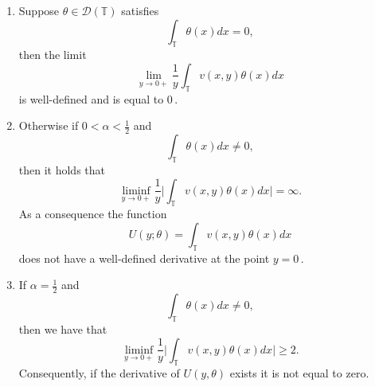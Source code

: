 \documentclass[10pt,a4paper]{amsart}
\begin{document}
\begin{proposition}\label{th1}
$$\,$$
\begin{enumerate}
\item Suppose $\theta \in \mathcal D({\mathbb{T}})$ satisfies
\begin{equation}
\int_{\mathbb{T}} \theta(x) dx =0,
\end{equation}
then the limit
$$
\lim_{y\rightarrow 0 +} \frac1{y}  \int_{\mathbb{T}} v (x,y) \theta (x)dx
$$
is well-defined and is equal to $0\,.$

\item Otherwise if $0 < \alpha < \frac{1}{2}$ and
\begin{equation}
\int_{\mathbb{T}} \theta(x) dx \not=0,
\end{equation}
then it holds that
$$
\liminf _{y \rightarrow 0 +} \frac1{y } \bigg\lvert \int_{\mathbb{T}} v (x,y) \theta (x)dx \bigg\rvert =\infty.
$$
As a consequence the function
\begin{equation}
U(y; \theta) = \int_{\mathbb{T}} v (x,y) \theta (x)dx
\end{equation}
does not have a well-defined derivative at the point $y=0\,.$ 
\item If $\alpha = \frac{1}{2}$ and 
\begin{equation}
\int_{\mathbb{T}} \theta(x) dx \not=0,
\end{equation}
then we have that
\begin{equation}
\liminf _{y \rightarrow 0 +} \frac1{y } \bigg\lvert \int_{\mathbb{T}} v (x,y) \theta (x)dx \bigg\rvert \geq 2.
\end{equation}
Consequently, if the derivative of $U(y,\theta)$ exists it is not equal to zero.
\end{enumerate}
\end{proposition}
\end{document}
